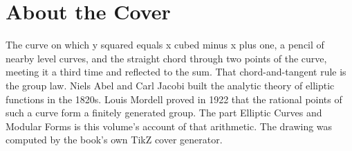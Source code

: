 \backmatter
\cleardoublepage
\chapter*{About the Cover}
\noindent The curve on which y squared equals x cubed minus x plus one, a pencil of nearby level curves, and the straight chord through two points of the curve, meeting it a third time and reflected to the sum. That chord-and-tangent rule is the group law. Niels Abel and Carl Jacobi built the analytic theory of elliptic functions in the 1820s. Louis Mordell proved in 1922 that the rational points of such a curve form a finitely generated group. The part Elliptic Curves and Modular Forms is this volume's account of that arithmetic. The drawing was computed by the book's own TikZ cover generator.
